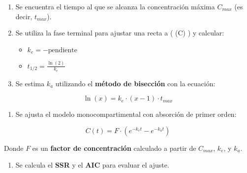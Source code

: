 \documentclass[11pt]{article}
\providecommand{\tightlist}{%
      \setlength{\itemsep}{0pt}\setlength{\parskip}{0pt}}
\begin{document}
\begin{enumerate}
\def\labelenumi{\arabic{enumi}.}
\tightlist
\item
  Se encuentra el tiempo al que se alcanza la concentración máxima
  \(C_{max}\) (es decir, \(t_{max}\)).
\item
  Se utiliza la fase terminal para ajustar una recta a ( \ln(C) ) y
  calcular:

  \begin{itemize}
  \tightlist
  \item
    \(k_e = -\text{pendiente}\)
  \item
    \(t_{1/2} = \frac{\ln(2)}{k_e}\)
  \end{itemize}
\item
  Se estima \(k_a\) utilizando el \textbf{método de bisección} con la
  ecuación:
\end{enumerate}

\[
\ln(x) = k_e \cdot (x - 1) \cdot t_{max}
\]

\begin{enumerate}
\def\labelenumi{\arabic{enumi}.}
\setcounter{enumi}{3}
\tightlist
\item
  Se ajusta el modelo monocompartimental con absorción de primer orden:
\end{enumerate}

\[
C(t) = F \cdot \left(e^{-k_e t} - e^{-k_a t} \right)
\]

Donde \(F\) es un \textbf{factor de concentración} calculado a partir de
\(C_{max}\), \(k_e\), y \(k_a\).

\begin{enumerate}
\def\labelenumi{\arabic{enumi}.}
\setcounter{enumi}{4}
\tightlist
\item
  Se calcula el \textbf{SSR} y el \textbf{AIC} para evaluar el ajuste.
\end{enumerate}
\end{document}
